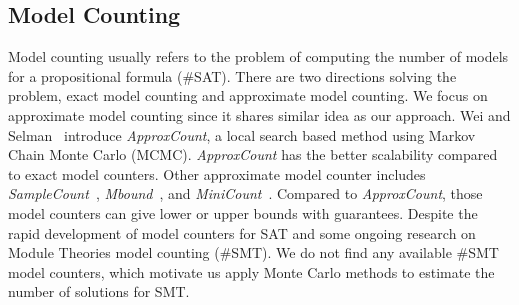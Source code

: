 \subsection{Model Counting}
Model counting usually refers to the problem of computing the number of 
models for a propositional formula (\#SAT). There are two directions
solving the problem, exact model counting and approximate model 
counting. We focus on approximate model counting since it shares similar 
idea as our approach. Wei and Selman~\cite{wei2005new} introduce
\textit{ApproxCount}, a local search based method using Markov Chain Monte 
Carlo (MCMC). \textit{ApproxCount} has the better scalability compared to 
exact model counters. Other approximate model counter includes 
\textit{SampleCount}~\cite{gomes2007sampling},
\textit{Mbound}~\cite{gomes2006model}, and \textit{MiniCount}~\cite{kroc2008leveraging}. 
Compared to \textit{ApproxCount},
those model counters can give lower or upper bounds with guarantees.
Despite the rapid development of model counters for SAT and some ongoing
research on Module Theories model counting (\#SMT). We do not find any available
\#SMT model counters, which motivate us apply Monte Carlo methods to estimate 
the number of solutions for SMT.



